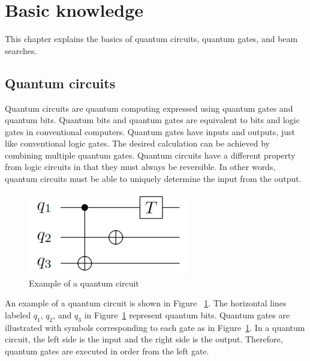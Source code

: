 \section{Basic knowledge}
This chapter explains the basics of quantum circuits, quantum gates, and beam searches.
\subsection{Quantum circuits}
Quantum circuits are quantum computing\cite{deutsch1985quantum}
expressed using quantum gates and quantum bits.
Quantum bits and quantum gates are equivalent to bits and logic gates in conventional computers.
Quantum gates have inputs and outputs, just like conventional logic gates.
The desired calculation can be achieved by combining multiple quantum gates.
Quantum circuits have a different property from logic circuits in that they must always be reversible.
In other words, quantum circuits must be able to uniquely determine the input from the output.
\par
\begin{figure}[tbp]
\centering
\includegraphics[width=7cm]{img/qcircuit.pdf}
\caption{Example of a quantum circuit}
\label{qcircuit}
\end{figure}
An example of a quantum circuit is shown in Figure ~\ref{qcircuit}.
The horizontal lines labeled $q_{1}$, $q_{2}$, and $q_{3}$ in Figure~\ref{qcircuit}
represent quantum bits.
Quantum gates are illustrated with symbols corresponding to each gate as in Figure~\ref{qcircuit}.
In a quantum circuit, the left side is the input and the right side is the output.
Therefore, quantum gates are executed in order from the left gate.
